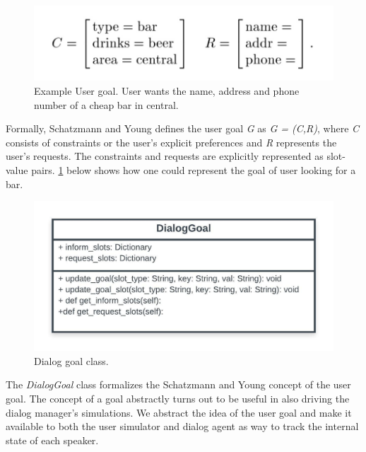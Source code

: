 \begin{figure}[h!]
	\includegraphics[scale=.35]{diagrams/schatzmann_goal_fig.jpeg}
	\caption{Example User goal. User wants the name, address and phone number of a cheap bar in central.  \cite{Schatzmann2009TheHA} }
	\label{fig:goals1}
\end{figure}

Formally, Schatzmann and Young defines the user goal \textit{G} as \textit{G = (C,R)}, where \textit{C} consists of constraints or the user's explicit preferences and \textit{R} represents the user's requests. The constraints and requests are explicitly represented as slot-value pairs. \ref{fig:goals1} below shows how one could represent the goal of user looking for a bar. 

\begin{figure}[h!]
	\centering
	\includegraphics[scale=1]{diagrams/dialog_goal_class.jpeg}
	\caption{Dialog goal class.  }
	\label{fig:goal_class}
\end{figure}

The \textit{DialogGoal} class formalizes the Schatzmann and Young concept of the user goal. The concept of a goal abstractly turns out to be useful in also driving the dialog manager's simulations. We abstract the idea of the user goal and make it available to both the user simulator and dialog agent as way to track the internal state of each speaker. 

